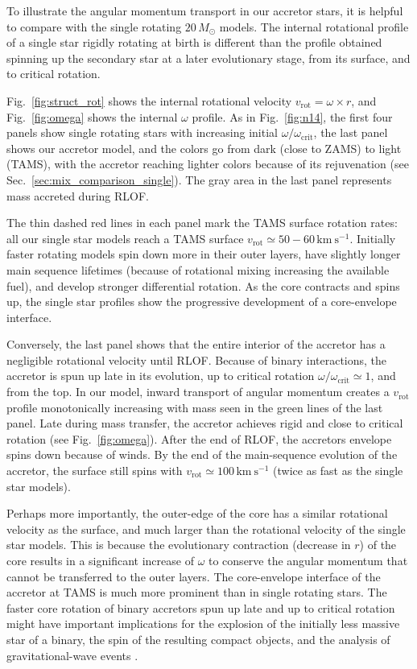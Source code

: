 \documentclass[twocolumn,twocolappendix,trackchanges]{aastex63}
\newcommand{\kms}{{\mathrm{km\ s^{-1}}}}
\DeclareRobustCommand{\Figref}[1]{Fig.~\ref{#1}}
\DeclareRobustCommand{\Secref}[1]{Sec.~\ref{#1}}
\begin{document}
To illustrate the angular momentum transport in our accretor stars, it
is helpful to compare with the single rotating $20\,M_\odot$
models. The internal rotational profile of a single star rigidly
rotating at birth is different than the profile obtained spinning up
the secondary star at a later evolutionary stage, from its surface,
and to critical rotation.

\Figref{fig:struct_rot} shows the internal
rotational velocity $v_\mathrm{rot}=\omega\times r$, and
\Figref{fig:omega} shows the internal $\omega$ profile. As in
\Figref{fig:n14}, the first four panels show single rotating stars
with increasing initial $\omega/\omega_\mathrm{crit}$, the last panel
shows our accretor model, and the colors go from dark (close to ZAMS) to light
(TAMS), with the accretor reaching lighter colors because of its
rejuvenation (see \Secref{sec:mix_comparison_single}). The gray area in the last panel represents mass accreted
during RLOF.

The thin dashed red lines in each panel mark the TAMS surface rotation
rates: all our single star models reach a TAMS surface
$v_\mathrm{rot}\simeq50-60\,\kms$. Initially faster rotating models spin
down more in their outer layers, have slightly longer main sequence
lifetimes (because of rotational mixing increasing the available fuel), and develop stronger differential rotation. As the core
contracts and spins up, the single star
profiles show the progressive development of a core-envelope
interface.

Conversely, the last panel shows that the entire interior of the
accretor has a negligible rotational velocity until RLOF. Because of
binary interactions, the accretor is spun up late in its evolution, up
to critical rotation $\omega/\omega_\mathrm{crit}\simeq1$, and from
the top. In our model, inward transport of angular momentum creates a
$v_\mathrm{rot}$ profile monotonically increasing with mass seen in
the green lines of the last panel. Late during mass transfer, the
accretor achieves rigid and close to critical rotation (see
\Figref{fig:omega}). After the end of RLOF, the accretors envelope
spins down because of winds. By the end of the main-sequence evolution
of the accretor, the surface still spins with
$v_\mathrm{rot}\simeq100\,\kms$ (twice as fast as the single star
models).

Perhaps more importantly, the outer-edge of the core has a similar
rotational velocity as the surface, and much larger than the
rotational velocity of the single star models. This is because the
evolutionary contraction (decrease in $r$) of the core results in a
significant increase of $\omega$ to conserve the angular momentum that
cannot be transferred to the outer layers. The core-envelope interface
of the accretor at TAMS is much more prominent than in single rotating
stars.  The faster core rotation of binary accretors spun up late and
up to critical rotation might have important implications for the
explosion of the initially less massive star of a binary, the
spin of the resulting compact objects, and the analysis of
gravitational-wave events \citep[e.g.,][]{zaldarriaga:18, qin:18, callister:21}.
\end{document}
